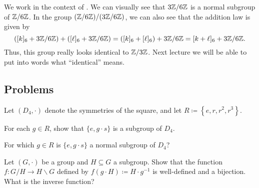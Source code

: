 \documentclass[../notes.tex]{subfiles}
\begin{document}
\begin{example} \label{ex:double-quotient-is-z3z}
    We work in the context of . We can visually see that $3\mathbb Z/6\mathbb Z$ is a normal subgroup of $\mathbb Z/6\mathbb Z$. In the group $(\mathbb Z/6\mathbb Z)/(3\mathbb Z/6\mathbb Z)$, we can also see that the addition law is given by
    \[([k]_6+3\mathbb Z/6\mathbb Z)+([\ell]_6+3\mathbb Z/6\mathbb Z)=([k]_6+[\ell]_6)+3\mathbb Z/6\mathbb Z=[k+\ell]_6+3\mathbb Z/6\mathbb Z.\]
    Thus, this group really looks identical to $\mathbb Z/3\mathbb Z$. Next lecture we will be able to put into words what ``identical'' means.
\end{example}

\subsection{Problems}

\begin{homework}
    Let $(D_4,\cdot)$ denote the symmetries of the square, and let $R\coloneqq\left\{e,r,r^2,r^3\right\}$.
    \begin{listalph}
        \item For each $g\in R$, show that $\{e,g\cdot s\}$ is a subgroup of $D_4$.
        \item For which $g\in R$ is $\{e,g\cdot s\}$ a normal subgroup of $D_4$?
    \end{listalph}
\end{homework}

\begin{homework}
    Let $(G,\cdot)$ be a group and $H\subseteq G$ a subgroup. Show that the function $f\colon G/H\to H\backslash G$ defined by $f(g\cdot H)\coloneqq H\cdot g^{-1}$ is well-defined and a bijection. What is the inverse function?
\end{homework}

\end{document}
